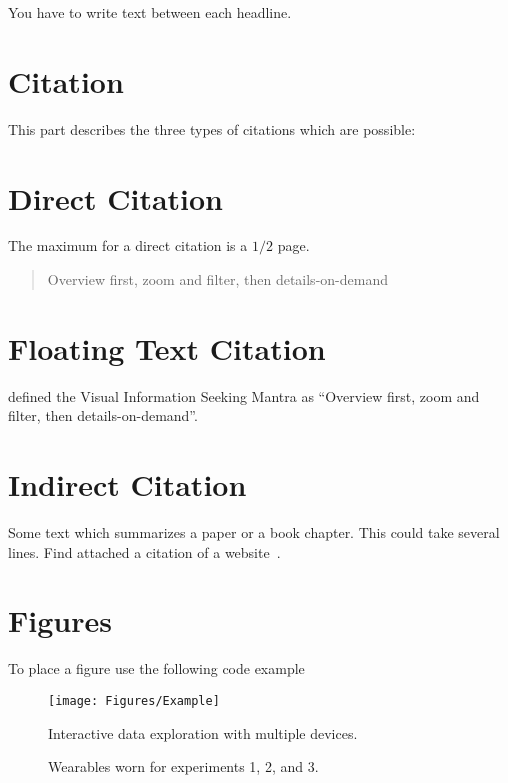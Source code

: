 You have to write text between each headline.

\section{Citation}

This part describes the three types of citations which are possible:

\section{Direct Citation}

The maximum for a direct citation is a ${1/2}$ page.

\begin{quotation}
	Overview first, zoom and filter, then details-on-demand
	\autocite{shneiderman_eyes_1996}
\end{quotation}

\section{Floating Text Citation}

\textcite{shneiderman_eyes_1996} defined the Visual Information Seeking Mantra as ``Overview first, zoom and filter, then details-on-demand''.

\section{Indirect Citation}

Some text which summarizes a paper or a book chapter. This could take several lines.
Find attached a citation of a website~\autocite{kaley_match_2018}.

\newpage
\section{Figures}

To place a figure use the following code example

\begin{figure}[ht!]
  \centering
  \texttt{[image: Figures/Example]}
  \caption{Interactive data exploration with multiple devices.}
  \label{fig:example}
\end{figure}




\begin{figure}[h]
    \centering
    \caption{Wearables worn for experiments 1, 2, and 3.}\label{fig:figure2}
\end{figure}

